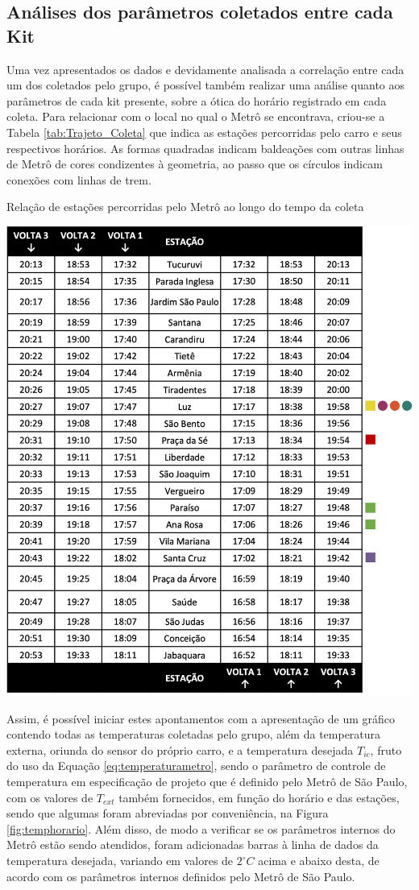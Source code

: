 \documentclass[acronym,symbols,table]{fei}
\begin{document}
\subsection{Análises dos parâmetros coletados entre cada Kit} \label{analisekits}

Uma vez apresentados os dados e devidamente analisada a correlação entre cada um dos coletados pelo grupo, é possível também realizar uma análise quanto aos parâmetros de cada kit presente, sobre a ótica do horário registrado em cada coleta. Para relacionar com o local no qual o Metrô se encontrava, criou-se a Tabela \ref{tab:Trajeto_Coleta} que indica as estações percorridas pelo carro e seus respectivos horários. As formas quadradas indicam baldeações com outras linhas de Metrô de cores condizentes à geometria, ao passo que os círculos indicam conexões com linhas de trem.

\begin{table}[!htb] 
 \centering
    \caption{Relação de estações percorridas pelo Metrô ao longo do tempo da coleta}
    \includegraphics[width=0.6\linewidth]{Tabelas/Trajeto_Coleta.png}
    \label{tab:Trajeto_Coleta}
\end{table}
\newpage
Assim, é possível iniciar estes apontamentos com a apresentação de um gráfico contendo todas as temperaturas coletadas pelo grupo, além da temperatura externa, oriunda do sensor do próprio carro, e a temperatura desejada $T_{ic}$, fruto do uso da Equação \ref{eq:temperaturametro}, sendo o parâmetro de controle de temperatura em especificação de projeto que é definido pelo Metrô de São Paulo, com os valores de $T_{ext}$ também fornecidos, em função do horário e das estações, sendo que algumas foram abreviadas por conveniência, na Figura \ref{fig:temphorario}.  Além disso, de modo a verificar se os parâmetros internos do Metrô estão sendo atendidos, foram adicionadas barras à linha de dados da temperatura desejada, variando em valores de $2 ^\circ C$ acima e abaixo desta, de acordo com os parâmetros internos definidos pelo Metrô de São Paulo.
\end{document}
